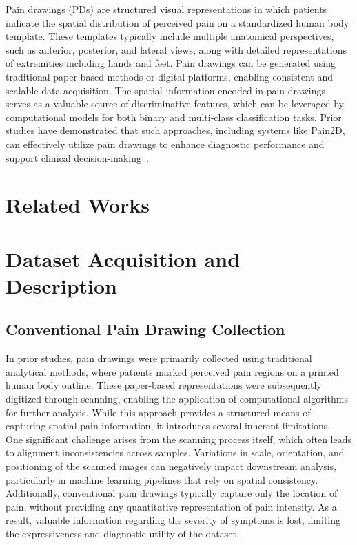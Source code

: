 \documentclass[12pt]{report}
\begin{document}
Pain drawings (PDs) are structured visual representations in which patients indicate the spatial distribution of perceived pain on a standardized human body template. These templates typically include multiple anatomical perspectives, such as anterior, posterior, and lateral views, along with detailed representations of extremities including hands and feet. Pain drawings can be generated using traditional paper-based methods or digital platforms, enabling consistent and scalable data acquisition. The spatial information encoded in pain drawings serves as a valuable source of discriminative features, which can be leveraged by computational models for both binary and multi-class classification tasks. Prior studies have demonstrated that such approaches, including systems like Pain2D, can effectively utilize pain drawings to enhance diagnostic performance and support clinical decision-making~\cite{wester2020pain, emmert2018pain2d}.


\chapter{Related Works}


\chapter{Dataset Acquisition and Description}

\section{Conventional Pain Drawing Collection}

In prior studies, pain drawings were primarily collected using traditional analytical methods, where patients marked perceived pain regions on a printed human body outline. These paper-based representations were subsequently digitized through scanning, enabling the application of computational algorithms for further analysis. While this approach provides a structured means of capturing spatial pain information, it introduces several inherent limitations.\\

One significant challenge arises from the scanning process itself, which often leads to alignment inconsistencies across samples. Variations in scale, orientation, and positioning of the scanned images can negatively impact downstream analysis, particularly in machine learning pipelines that rely on spatial consistency. Additionally, conventional pain drawings typically capture only the location of pain, without providing any quantitative representation of pain intensity. As a result, valuable information regarding the severity of symptoms is lost, limiting the expressiveness and diagnostic utility of the dataset.\\
\end{document}
